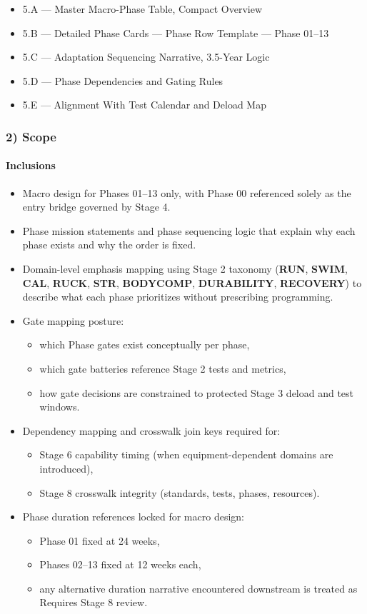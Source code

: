 \documentclass[10pt]{article}
\begin{document}
\begin{itemize}
\item 5.A — Master Macro-Phase Table, Compact Overview
\item 5.B — Detailed Phase Cards — Phase Row Template — Phase 01–13
\item 5.C — Adaptation Sequencing Narrative, 3.5-Year Logic
\item 5.D — Phase Dependencies and Gating Rules
\item 5.E — Alignment With Test Calendar and Deload Map
\end{itemize}

\subsubsection*{2) Scope}

\paragraph*{Inclusions}

\begin{itemize}
\item Macro design for Phases 01–13 only, with Phase 00 referenced solely as the entry bridge governed by Stage 4.
\item Phase mission statements and phase sequencing logic that explain why each phase exists and why the order is fixed.
\item Domain-level emphasis mapping using Stage 2 taxonomy (\textbf{RUN}, \textbf{SWIM}, \textbf{CAL}, \textbf{RUCK}, \textbf{STR}, \textbf{BODYCOMP}, \textbf{DURABILITY}, \textbf{RECOVERY}) to describe what each phase prioritizes without prescribing programming.
\item Gate mapping posture:
  \begin{itemize}
  \item which Phase gates exist conceptually per phase,
  \item which gate batteries reference Stage 2 tests and metrics,
  \item how gate decisions are constrained to protected Stage 3 deload and test windows.
  \end{itemize}
\item Dependency mapping and crosswalk join keys required for:
  \begin{itemize}
  \item Stage 6 capability timing (when equipment-dependent domains are introduced),
  \item Stage 8 crosswalk integrity (standards, tests, phases, resources).
  \end{itemize}
\item Phase duration references locked for macro design:
  \begin{itemize}
  \item Phase 01 fixed at 24 weeks,
  \item Phases 02–13 fixed at 12 weeks each,
  \item any alternative duration narrative encountered downstream is treated as Requires Stage 8 review.
  \end{itemize}
\end{itemize}
\end{document}
